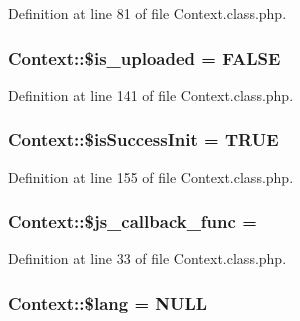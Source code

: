 Definition at line 81 of file Context.\+class.\+php.

\subsubsection[{\texorpdfstring{\$is\+\_\+uploaded}{$is_uploaded}}]{\setlength{\rightskip}{0pt plus 5cm}Context\+::\$is\+\_\+uploaded = F\+A\+L\+SE}\hypertarget{classContext_a4f8c544baae73ab83d08ec55e0c7c00d}{}\label{classContext_a4f8c544baae73ab83d08ec55e0c7c00d}


Definition at line 141 of file Context.\+class.\+php.

\subsubsection[{\texorpdfstring{\$is\+Success\+Init}{$isSuccessInit}}]{\setlength{\rightskip}{0pt plus 5cm}Context\+::\$is\+Success\+Init = T\+R\+UE}\hypertarget{classContext_a342fb7b74268197dea5cadbe62aaea7a}{}\label{classContext_a342fb7b74268197dea5cadbe62aaea7a}


Definition at line 155 of file Context.\+class.\+php.

\subsubsection[{\texorpdfstring{\$js\+\_\+callback\+\_\+func}{$js_callback_func}}]{\setlength{\rightskip}{0pt plus 5cm}Context\+::\$js\+\_\+callback\+\_\+func = \textquotesingle{}\textquotesingle{}}\hypertarget{classContext_afddd5e6374a20b88466dfd1cb6f32d62}{}\label{classContext_afddd5e6374a20b88466dfd1cb6f32d62}


Definition at line 33 of file Context.\+class.\+php.

\subsubsection[{\texorpdfstring{\$lang}{$lang}}]{\setlength{\rightskip}{0pt plus 5cm}Context\+::\$lang = N\+U\+LL}\hypertarget{classContext_a0771720dad655d0c53f6f31066c67a40}{}\label{classContext_a0771720dad655d0c53f6f31066c67a40}


